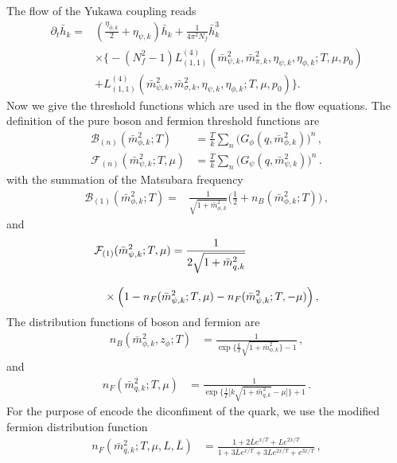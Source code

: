 \documentclass[%
reprint,
superscriptaddress,
showpacs,preprintnumbers,
 amsmath,amssymb,
 aps,
prd,
]{revtex4-1}
\begin{document}
The flow of the Yukawa coupling reads
\begin{align}
\partial_t\bar h_k=&(\frac{\eta_{\phi,k}}{2}+\eta_{\psi,k})\bar h_k+\frac{1}{4\pi^2 N_f}\bar h^3_k\nonumber\\[2ex]
&\times \bigg\{-(N_f^2-1)L^{(4)}_{(1,1)}(\bar m^2_{\psi,k},\bar m^2_{\pi,k},\eta_{\psi,k},\eta_{\phi,k};T,\mu,p_0)\nonumber\\[2ex]
&+L^{(4)}_{(1,1)}(\bar m^2_{\psi,k},\bar m^2_{\sigma,k},\eta_{\psi,k},\eta_{\phi,k};T,\mu,p_0)\bigg\}.
\end{align}
Now we give the threshold functions which are used in the flow equations. The definition of the pure boson and fermion threshold functions are
\begin{align}
  \mathcal{B}_{(n)}(\bar{m}^{2}_{\phi,k};T)&=\frac{T}{k}\sum_{n}\Big(G_{\phi}(q,\bar{m}^{2}_{\phi,k})\Big)^n\,,\label{eq:Bn} \\[2ex]
  \mathcal{F}_{(n)}(\bar{m}^{2}_{\psi,k};T,\mu)&=\frac{T}{k}\sum_{n}\Big(G_\psi(q,\bar{m}^{2}_{\psi,k})\Big)^n\,.\label{eq:Fn}
\end{align}
with the summation of the Matsubara frequency
\begin{align}
    \mathcal{B}_{(1)}(\bar{m}^{2}_{\phi,k};T)=&\frac{1}{\sqrt{1+\bar{m}^{2}_{\phi,k}}}\bigg(\frac{1}{2}+n_{B}(\bar{m}^{2}_{\phi,k};T)\bigg)\,,\label{eq:B1}
\end{align}
and
\begin{align}
    &\mathcal{F}_{(1)}(\bar{m}^{2}_{\psi,k};T,\mu)=\frac{1}{2\sqrt{1+\bar{m}^{2}_{q,k}}}\nonumber\\[2ex]
    &\hspace{.3cm}\times\Big(1-n_{F}(\bar{m}^{2}_{\psi,k};T,\mu)-n_{F}(\bar{m}^{2}_{\psi,k};T,-\mu)\Big)\,,\label{eq:F1}
\end{align}
The distribution functions of boson and fermion are
\begin{align}
  n_B(\bar{m}^{2}_{\phi,k},z_\phi;T)&=\frac{1}{\exp\bigg\{\frac{k}{T}\sqrt{1+\bar{m}^{2}_{\phi,k}}\bigg\}-1}\,,
\end{align} 
and
\begin{align}
  n_F(\bar{m}^{2}_{q,k};T,\mu)&=\frac{1}{\exp\bigg\{\frac{1}{T}\Big[k\sqrt{1+\bar{m}^{2}_{q,k}}-\mu\Big]\bigg\}+1}\,.\label{eq:nf}
\end{align}
For the purpose of encode the diconfiment of the quark, we use the modified fermion distribution function 
\begin{align}
n_F(\bar{m}^{2}_{q,k};T,\mu,L,\bar{L})&=\frac{1+2\bar{L}e^{x/T}+Le^{2x/T}}{1+3\bar{L}e^{x/T}+3Le^{2x/T}+e^{3x/T}}\,,
\end{align}
\end{document}
